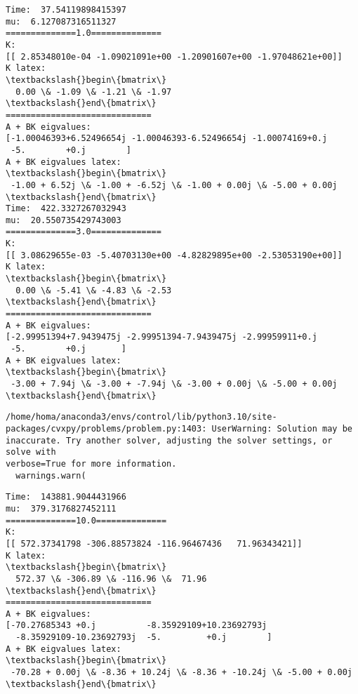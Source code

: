\documentclass[11pt]{article}
\begin{document}
    \begin{Verbatim}[commandchars=\\\{\}]
Time:  37.54119898415397
mu:  6.127087316511327
==============1.0==============
K:
[[ 2.85348010e-04 -1.09021091e+00 -1.20901607e+00 -1.97048621e+00]]
K latex:
\textbackslash{}begin\{bmatrix\}
  0.00 \& -1.09 \& -1.21 \& -1.97
\textbackslash{}end\{bmatrix\}
=============================
A + BK eigvalues:
[-1.00046393+6.52496654j -1.00046393-6.52496654j -1.00074169+0.j
 -5.        +0.j        ]
A + BK eigvalues latex:
\textbackslash{}begin\{bmatrix\}
 -1.00 + 6.52j \& -1.00 + -6.52j \& -1.00 + 0.00j \& -5.00 + 0.00j
\textbackslash{}end\{bmatrix\}
Time:  422.3327267032943
mu:  20.550735429743003
==============3.0==============
K:
[[ 3.08629655e-03 -5.40703130e+00 -4.82829895e+00 -2.53053190e+00]]
K latex:
\textbackslash{}begin\{bmatrix\}
  0.00 \& -5.41 \& -4.83 \& -2.53
\textbackslash{}end\{bmatrix\}
=============================
A + BK eigvalues:
[-2.99951394+7.9439475j -2.99951394-7.9439475j -2.99959911+0.j
 -5.        +0.j       ]
A + BK eigvalues latex:
\textbackslash{}begin\{bmatrix\}
 -3.00 + 7.94j \& -3.00 + -7.94j \& -3.00 + 0.00j \& -5.00 + 0.00j
\textbackslash{}end\{bmatrix\}
    \end{Verbatim}

    \begin{Verbatim}[commandchars=\\\{\}]
/home/homa/anaconda3/envs/control/lib/python3.10/site-
packages/cvxpy/problems/problem.py:1403: UserWarning: Solution may be
inaccurate. Try another solver, adjusting the solver settings, or solve with
verbose=True for more information.
  warnings.warn(
    \end{Verbatim}

    \begin{Verbatim}[commandchars=\\\{\}]
Time:  143881.9044431966
mu:  379.3176827452111
==============10.0==============
K:
[[ 572.37341798 -306.88573824 -116.96467436   71.96343421]]
K latex:
\textbackslash{}begin\{bmatrix\}
  572.37 \& -306.89 \& -116.96 \&  71.96
\textbackslash{}end\{bmatrix\}
=============================
A + BK eigvalues:
[-70.27685343 +0.j          -8.35929109+10.23692793j
  -8.35929109-10.23692793j  -5.         +0.j        ]
A + BK eigvalues latex:
\textbackslash{}begin\{bmatrix\}
 -70.28 + 0.00j \& -8.36 + 10.24j \& -8.36 + -10.24j \& -5.00 + 0.00j
\textbackslash{}end\{bmatrix\}
    \end{Verbatim}

    \begin{center}
    \end{center}
    { \hspace*{\fill} \\}
    
\end{document}

